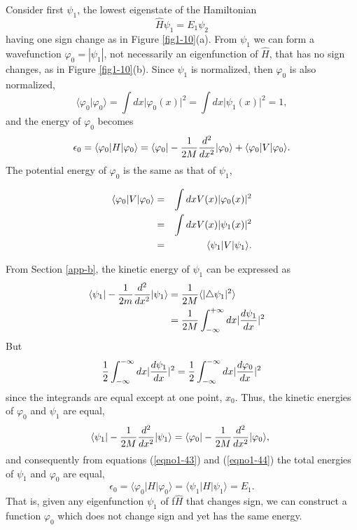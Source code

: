 Consider first $\psi_1$, the lowest eigenstate of the Hamiltonian
\begin{equation}
{\hat H} \psi_1 = E_1 \psi_2
\end{equation}
having one sign change as in Figure \ref{fig1-10}(a).
From $\psi_1$ we can form a wavefunction $\varphi_0 = | \psi_1 |$, not
necessarily an eigenfunction of ${\hat H}$, that has no sign changes,
as in Figure \ref{fig1-10}(b). Since $\psi_1$ is normalized, then
$\varphi_0$ is also normalized,
\begin{equation}
\langle \varphi_0 \vert \varphi_0 \rangle = \int dx \vert \varphi_0 (x) \vert^2 = 
\int dx \vert \psi_1 ( x ) \vert^2 = 1,
\end{equation}
and the energy of $\varphi_0$ becomes
\begin{equation}
\epsilon_0 = \langle \varphi_0 \vert H \vert \varphi_0 \rangle = \langle \varphi_0 
\vert - {1 \over 2M} {d^2 \over dx^2} \vert \varphi_0 \rangle + \langle 
\varphi_0 \vert V \vert \varphi_0 \rangle.
\end{equation}
The potential energy of $\varphi_0$  is the same as that of $\psi_1$,

\begin{eqnarray}
\langle \varphi_0 \vert V \vert \varphi_0 \rangle 
                   &=& \int dxV(x) \vert \varphi_0(x)\vert^2\cr
                   &=& \int dxV(x) \vert \psi_1 (x) \vert^2\cr 
                   &=& \langle \psi_1 \vert V \vert \psi_1\rangle.
\label{eqno1-43}
\end{eqnarray}

From Section \ref{app-b}, the kinetic energy of $\psi_1$ can be expressed as
\begin{eqnarray}
\langle \psi_1 \vert - {1 \over 2m} {d^2 \over dx^2} \vert \psi_1 
\rangle &= {1 \over 2M} \langle \vert \triangle \psi_1 \vert^2 \rangle\cr
&= {1 \over 2M} \int^{+ \infty}_{- \infty} dx \vert {d \psi_1 \over dx} 
\vert^2\cr
\end{eqnarray}
But
\begin{equation}
{1 \over 2} \int^{- \infty}_{- \infty} dx \vert {d\psi_1 \over dx} 
\vert^2 = {1 \over 2} \int^{- \infty}_{- \infty} dx \vert {d \varphi_0 \over 
dx} \vert^2
\end{equation}
since the integrands are equal except at one point, $x_0$. Thus, the kinetic 
energies of $\varphi_0$ and $\psi_1$ are equal,
\begin{equation}
\langle \psi_1 \vert - {1 \over 2M} {d^2 \over dx^2} \vert \psi_1 
\rangle = \langle \varphi_0 \vert   - {1 \over 2M} {d^2 \over dx^2} \vert 
\varphi_0 \rangle ,\
\label{eqno1-44}
\end{equation}
and consequently from equations (\ref{eqno1-43}) and (\ref{eqno1-44})
the total energies of $\psi_1$ and $\varphi_0$ are equal,
\begin{equation}
\epsilon_0 = \langle \varphi_0 \vert H \vert \varphi_0 \rangle = \langle 
\psi_1 \vert H \vert \psi_1 \rangle = E_1.
\end{equation}
That is, given any eigenfunction $\psi_1$ of f${\hat H}$ that changes 
sign, we can construct a function $\varphi_0$
which does not change sign and yet has the same energy.
    
